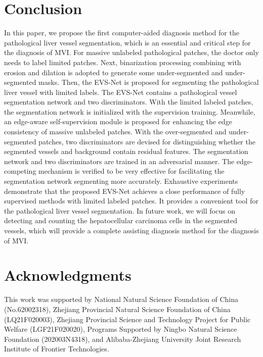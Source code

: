 \documentclass[letterpaper]{article} %
\begin{document}
\section{Conclusion}
In this paper, we propose the first computer-aided diagnosis method for the pathological liver vessel segmentation,
which is an essential and critical step for the diagnosis of MVI.
For massive unlabeled pathological patches,
the doctor only needs to label limited patches.
Next, binarization processing combining with erosion and dilation is adopted to generate some under-segmented and under-segmented masks.
Then, the EVS-Net is proposed for segmenting the pathological liver vessel with limited labels.
The EVS-Net contains a pathological vessel segmentation network and two discriminators.
With the limited labeled patches, the segmentation network is initialized with the supervision training.
Meanwhile, an edge-aware self-supervision module is proposed for enhancing the edge consistency of massive unlabeled patches.
With the over-segmented and under-segmented patches,
two discriminators are devised for distinguishing
whether the segmented vessels and background contain residual features.
The segmentation network and two discriminators are trained in an adversarial manner.
The edge-competing mechanism is verified to be very effective for facilitating the segmentation network segmenting more accurately.
Exhaustive experiments demonstrate that the proposed EVS-Net achieves a close performance of fully supervised methods with limited labeled patches.
It provides a convenient tool for  the pathological liver vessel segmentation.
In future work, we will focus on detecting and counting the hepatocellular carcinoma cells in the segmented vessels,
which will provide a complete assisting diagnosis method for the diagnosis of MVI.

\section{ Acknowledgments}
This work was supported by National Natural Science Foundation of China (No.62002318), Zhejiang Provincial Natural Science Foundation of China (LQ21F020003), Zhejiang Provincial Science and Technology Project for Public Welfare (LGF21F020020), Programs Supported by Ningbo Natural Science Foundation (202003N4318), and Alibaba-Zhejiang University Joint Research Institute of Frontier Technologies.
%

\end{document}
